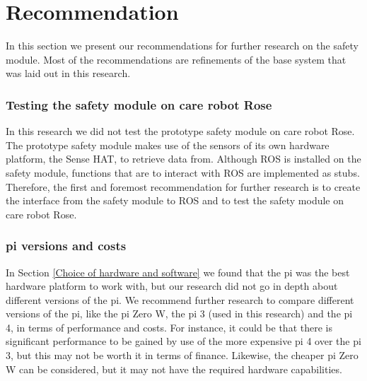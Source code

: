 \documentclass[12pt]{scrreprt}
\begin{document}
\newpage
\chapter{Recommendation}
\label{Recommendation}
    
In this section we present our recommendations for further research on the safety module. Most of the recommendations are refinements of the base system that was laid out in this research.

\subsection{Testing the safety module on care robot Rose}
In this research we did not test the prototype safety module on care robot Rose. The prototype safety module makes use of the sensors of its own hardware platform, the Sense HAT, to retrieve data from. Although ROS is installed on the safety module, functions that are to interact with ROS are implemented as stubs. Therefore, the first and foremost recommendation for further research is to create the interface from the safety module to ROS and to test the safety module on care robot Rose.

\subsection{\gls{pi} versions and costs}
\label{pi versions and costs}
In Section \ref{Choice of hardware and software} we found that the \gls{pi} was the best hardware platform to work with, but our research did not go in depth about different versions of the \gls{pi}. We recommend further research to compare different versions of the \gls{pi}, like the \gls{pi} Zero W, the \gls{pi} 3 (used in this research) and the \gls{pi} 4, in terms of performance and costs. For instance, it could be that there is significant performance to be gained by use of the more expensive \gls{pi} 4 over the \gls{pi} 3, but this may not be worth it in terms of finance. Likewise, the cheaper \gls{pi} Zero W can be considered, but it may not have the required hardware capabilities.
\end{document}
